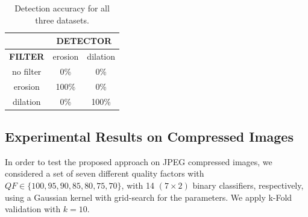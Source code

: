 \documentclass[review]{elsarticle}
\begin{document}
\begin{table}[!ht]
	\centering
	\caption{Detection accuracy for all three datasets.}
	\label{tab1:det_acc}
	\begin{tabular}{|l|l|l}
		\cline{2-3}
		\multicolumn{1}{c|}{}		     & \multicolumn{2}{c|}{\textbf{DETECTOR}}	           				    \\ \hline
		\multicolumn{1}{|c||}{\textbf{FILTER}}    & \multicolumn{1}{c|}{erosion} & \multicolumn{1}{c|}{dilation} \\ \hline
		\multicolumn{1}{|c||}{no filter} & \multicolumn{1}{c|}{0\%} 	& \multicolumn{1}{c|}{0\%}      \\ \hline
		\multicolumn{1}{|c||}{erosion}   & \multicolumn{1}{c|}{100\%}   & \multicolumn{1}{c|}{0\%}      \\ \hline
		\multicolumn{1}{|c||}{dilation}  & \multicolumn{1}{c|}{0\%}     & \multicolumn{1}{c|}{100\%}    \\ \hline
	\end{tabular}
\end{table}

\subsection{Experimental Results on Compressed Images}
\label{sec:compr_res}


In order to test the proposed approach on JPEG compressed images, we considered a set of seven different quality factors with $QF \in \{100,95,90,85,80,75,70\}$, with 14 $(7\times 2)$ binary classifiers, respectively,
using a Gaussian kernel with grid-search for the parameters. We apply k-Fold validation with $k = 10$.

%

%
\end{document}
